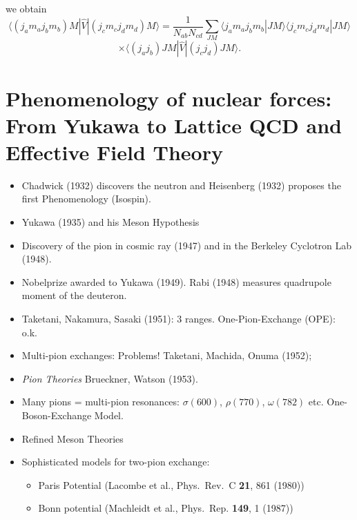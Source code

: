 \documentclass[graybox,sectrefs,envcountresetchap,open=right]{svmonodo}
\begin{document}
we obtain
\[
\langle (j_am_aj_bm_b)M |  \hat{V} | (j_cm_cj_dm_d)M\rangle=\frac{1}{N_{ab}N_{cd}}\sum_{JM}\langle j_am_aj_bm_b|JM\rangle\langle j_cm_cj_dm_d|JM\rangle
\]
\[
\times \langle (j_aj_b) JM | \hat{V} | (j_cj_d) JM \rangle.
\]




\section{Phenomenology of nuclear forces: From Yukawa to Lattice QCD and Effective Field Theory}


\begin{itemize}
\item Chadwick (1932) discovers the neutron and Heisenberg (1932) proposes the first Phenomenology (Isospin).  

\item Yukawa (1935) and his Meson Hypothesis       

\item Discovery of the pion in cosmic ray (1947) and in the Berkeley Cyclotron Lab (1948).

\item Nobelprize awarded to Yukawa (1949).  Rabi (1948) measures quadrupole moment of the deuteron.

\item Taketani, Nakamura, Sasaki (1951): 3 ranges.      One-Pion-Exchange (OPE): o.k.

\item Multi-pion exchanges: Problems!   Taketani, Machida, Onuma (1952);

\item \emph{Pion Theories} Brueckner, Watson (1953).

\item Many pions = multi-pion resonances: $\sigma(600)$,  $\rho(770)$,  $\omega(782)$ etc. One-Boson-Exchange Model.

\item Refined Meson Theories

\item Sophisticated models for two-pion exchange:
\begin{itemize}

      \item Paris Potential (Lacombe et al., Phys.~Rev.~C \textbf{21}, 861 (1980))

      \item Bonn potential (Machleidt et al., Phys.~Rep. \textbf{149}, 1 (1987))


\end{itemize}
\end{itemize}
\end{document}
